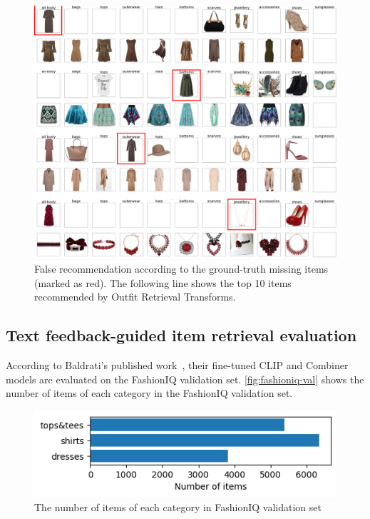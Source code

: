 \begin{figure}[h!]
    \centering
\includegraphics[width=\linewidth]{content/resources/images/fashion-recommendation/chapter4-ort-samples.png}
    \caption{False recommendation according to the ground-truth missing items (marked as red). The following line shows the top 10 items recommended by Outfit Retrieval Transforms.}
    \label{fig:chapter4-irt-samples}
\end{figure}

\subsection{Text feedback-guided item retrieval evaluation}
According to Baldrati's published work~\cite{Baldrati-CVPR2022-Conditioned}, their fine-tuned CLIP and Combiner models are evaluated on the FashionIQ validation set. 
\autoref{fig:fashioniq-val} shows the number of items of each category in the FashionIQ validation set.

\begin{figure}[ht!]
    \centering
    \includegraphics[width=0.7\linewidth]{content/resources/images/fashion-recommendation/chapter4-fashioniq-val.png}
    \caption{The number of items of each category in FashionIQ validation set}
    \label{fig:fashioniq-val}
\end{figure}

